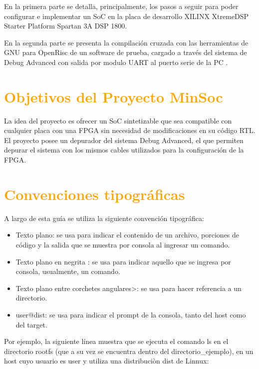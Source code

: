 En la primera parte se detalla, principalmente, los pasos a seguir para poder configurar e implementar un SoC en la placa de desarrollo XILINX XtremeDSP Starter Platform Spartan 3A DSP 1800.


En la segunda parte se presenta la compilación cruzada con las herramientas de GNU para OpenRisc de un software de prueba, cargado a través del sistema de Debug Advanced con salida por modulo UART al puerto serie de la PC .


\newpage
\section{\textcolor{orange}{Objetivos del Proyecto MinSoc}}

La idea del proyecto es ofrecer un SoC sintetizable que sea  compatible con cualquier placa con una FPGA sin necesidad de modificaciones en su código RTL. El proyecto posee un depurador del sistema Debug Advanced,  el que permiten depurar el sistema con los mismos cables utilizados para la configuración de la FPGA. 

\section{\textcolor{orange}{Convenciones tipográficas}}

A largo de esta guía se utiliza la siguiente convención tipográfica: 

\begin{itemize}
\item Texto plano: se usa para indicar el contenido de un archivo, porciones de código y la salida que se muestra por consola al ingresar un comando.
\item Texto plano en negrita : se usa para indicar aquello que se ingresa por consola, usualmente, un comando. 
\item Texto plano entre corchetes angulares>: se usa para hacer referencia a un directorio. 
\item user@dist: se usa para indicar el prompt de la consola, tanto del host como del target. 
\end{itemize} 
 
Por ejemplo, la siguiente línea muestra que se ejecuta el comando ls en el directorio rootfs (que a  su vez se encuentra dentro del directorio\_ejemplo), en un host cuyo usuario es user y utiliza una distribuciòn dist de Linnux:


